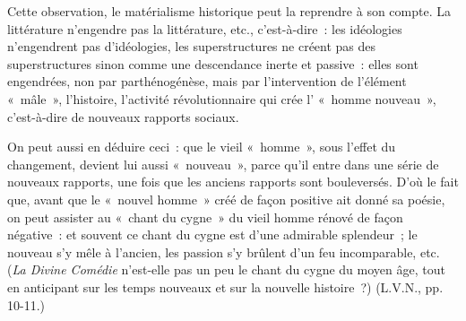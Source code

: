 \documentclass[french,twoside]{book} %
\begin{document}
\noindent Cette observation, le matérialisme historique peut la reprendre à son compte. La littérature n’engendre pas la littérature, etc., c’est-à-dire : les idéologies n’engendrent pas d’idéologies, les superstructures ne créent pas des superstructures sinon comme une descendance inerte et passive : elles sont engendrées, non par parthénogénèse, mais par l’intervention de l’élément « mâle », l’histoire, l’activité révolutionnaire qui crée l’ « homme nouveau », c’est-à-dire de nouveaux rapports sociaux.\par
On peut aussi en déduire ceci : que le vieil « homme », sous l’effet du changement, devient lui aussi « nouveau », parce qu’il entre dans une série de nouveaux rapports, une fois que les anciens rapports sont bouleversés. D'où le fait que, avant que le « nouvel homme » créé de façon positive ait donné sa poésie, on peut assister au « chant du cygne » du vieil homme rénové de façon négative : et souvent ce chant du cygne est d’une admirable splendeur ; le nouveau s’y mêle à l’ancien, les passion s’y brûlent d’un feu incomparable, etc. (\emph{La Divine Comédie} n’est-elle pas un peu le chant du cygne du moyen âge, tout en anticipant sur les temps nouveaux et sur la nouvelle histoire ?) (L.V.N., pp. 10-11.)\par
{\raggedleft \noindent [1930-1932]}
\end{document}
